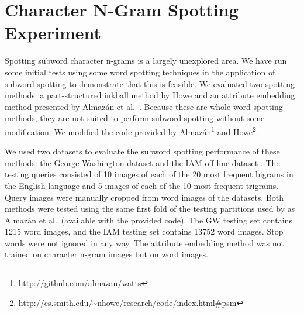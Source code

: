 \documentclass[conference]{IEEEtran}
\begin{document}
\section{Character N-Gram Spotting Experiment}
Spotting subword character n-grams is a largely unexplored area. We have run some initial tests using some word spotting techniques in the application of subword spotting to demonstrate that this is feasible. We evaluated two spotting methods: a part-structured inkball method by Howe \cite{Howe2013} and an attribute embedding method presented by Almaz\'{a}n et al.~\cite{Almazan2014}. Because these are whole word spotting methods, they are not suited to perform subword spotting without some modification. We modified the code provided by Almaz\'{a}n\footnote{\url{http://github.com/almazan/watts}} and Howe\footnote{\url{http://cs.smith.edu/~nhowe/research/code/index.html#psm}}.

We used two datasets to evaluate the subword spotting performance of these methods: the George Washington dataset \cite{GW} and the IAM off-line dataset \cite{IAM}. The testing queries consisted of 10 images of each of the 20 most frequent bigrams in the English language and 5 images of each of the 10 most frequent trigrams. Query images were manually cropped from word images of the datasets. 
Both methods were tested using the same first fold of the testing partitions used by as Almaz\'{a}n et al.~(available with the provided code).
The GW testing set contains 1215 word images, and the IAM testing set contains 13752 word images. Stop words were not ignored in any way. The attribute embedding method was not trained on character n-gram images but on word images.

\end{document}

